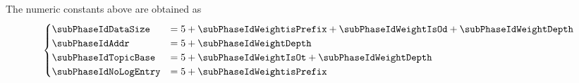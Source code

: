 \saNote{}
The numeric constants above are obtained as
\[
	\begin{cases}
		\subPhaseIdDataSize   & = 5 + \subPhaseIdWeightisPrefix +   \subPhaseIdWeightIsOd + \subPhaseIdWeightDepth          \\
		\subPhaseIdAddr       & = 5 + \subPhaseIdWeightDepth          \\
		\subPhaseIdTopicBase  & = 5 + \subPhaseIdWeightIsOt + \subPhaseIdWeightDepth \\
		\subPhaseIdNoLogEntry & = 5 + \subPhaseIdWeightisPrefix \\
	\end{cases}
\]
